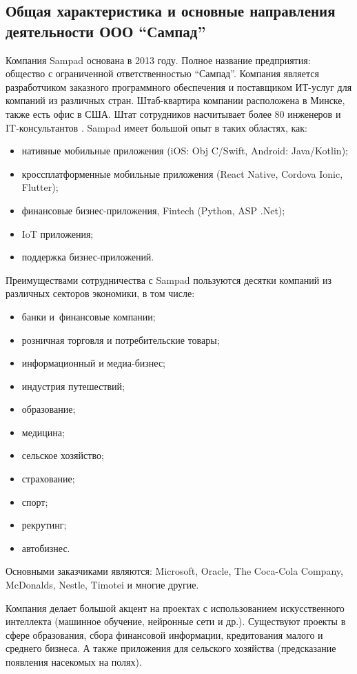 \subsection{Общая характеристика и основные направления деятельности ООО \enquote{Сампад}}
\label{sec:develop:company}

Компания Sampad основана в 2013 году. Полное название предприятия: общество с ограниченной ответственностью \enquote{Сампад}. Компания является разработчиком заказного программного обеспечения и поставщиком ИТ-услуг  для компаний из различных стран. Штаб-квартира компании расположена в Минске, также есть офис в США. Штат сотрудников насчитывает более 80 инженеров и IT-консультантов \cite{sampad_data}.
Sampad имеет большой опыт в таких областях, как:
\begin{itemize}
    \item нативные мобильные приложения (iOS: Obj C/Swift, Android: Java/Kotlin);
    \item кроссплатформенные мобильные приложения (React Native, Cordova Ionic, Flutter);
    \item финансовые бизнес-приложения, Fintech (Python, ASP .Net);
    \item IoT приложения;
    \item поддержка бизнес-приложений.
\end{itemize}
Преимуществами сотрудничества с Sampad пользуются десятки компаний из различных секторов экономики, в том числе:

\begin{itemize}
    \item банки и финансовые компании;
    \item розничная торговля и потребительские товары;
    \item информационный и медиа-бизнес;
    \item индустрия путешествий;
    \item образование;
    \item медицина;
    \item сельское хозяйство;
    \item страхование;
    \item спорт;
    \item рекрутинг;
    \item автобизнес.
\end{itemize}
Основными заказчиками являются: Microsoft, Oracle, The Coca-Cola Company, McDonalds, Nestle, Timotei и многие другие.

Компания делает большой акцент на проектах с использованием искусственного интеллекта (машинное обучение, нейронные сети и др.). Существуют проекты в сфере образования, сбора финансовой информации, кредитования малого и среднего бизнеса. А также приложения для сельского хозяйства (предсказание появления насекомых на полях).

